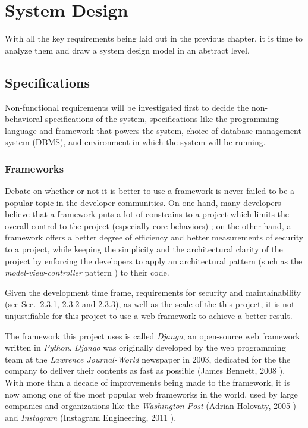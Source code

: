 

\chapter{System Design}
\label{chap:SYSDES}

With all the key requirements being laid out in the previous chapter, it is
time to analyze them and draw a system design model in an abstract
level. 

\section{Specifications}
Non-functional requirements will be investigated first to decide the
non-behavioral specifications of the system, specifications like the
programming language and framework that powers the system, choice of database
management system (DBMS),
and environment in which the system will be running.

\subsection{Frameworks}
Debate on whether or not it is better to use a framework is never failed to be
a popular topic in the developer communities. On one hand, many developers
believe that a framework puts a lot of constrains to a project which limits the
overall control to the project (especially core behaviors) \cite{frameworks};
on the other hand, a framework offers a better degree of efficiency and better
measurements of security to a project, while keeping the simplicity and
the architectural clarity of the project by enforcing the developers to apply
an architectural pattern (such as the \emph{model-view-controller} pattern
\cite{mvc}) to their code.

\medskip

Given the development time frame, requirements for
security and maintainability (see Sec.~2.3.1, 2.3.2 and 2.3.3),
as well as the scale of the this project,
it is not unjustifiable for this project to use a web framework to achieve a
better result.

\medskip

The framework this project uses is called \emph{Django}, an open-source web
framework written in \emph{Python}. \emph{Django} was originally developed by
the web programming team at the \emph{Lawrence Journal-World} newspaper in 2003,
dedicated for the the company to deliver their contents as fast as possible
(James Bennett, 2008 \cite{django}). With more than a decade of improvements
being made to the framework, it is now among one of the most popular web
frameworks in the world, used by large companies and organizations like the
\emph{Washington Post} (Adrian Holovaty, 2005 \cite{djangoWashingtonPost})
and \emph{Instagram} (Instagram Engineering, 2011 \cite{djangoInstagram}).
\medskip

